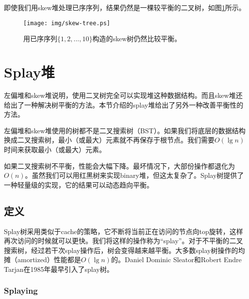 \documentclass[UTF8]{article}
\begin{document}
即使我们用skew堆处理已序序列，结果仍然是一棵较平衡的二叉树，如图\ref{fig:skew-tree}所示。

\begin{figure}[htbp]
   \begin{center}
   	  \texttt{[image: img/skew-tree.ps]}
    \caption{用已序序列$\{1, 2, ..., 10\}$构造的skew树仍然比较平衡。}
    \label{fig:skew-tree}
   \end{center}
\end{figure}



\section{Splay堆}
\label{splayheap}

左偏堆和skew堆说明，使用二叉树完全可以实现堆这种数据结构。而且skew堆还给出了一种解决树平衡的方法。本节介绍的splay堆给出了另外一种改善平衡性的方法。

左偏堆和skew堆使用的树都不是二叉搜索树（BST）。如果我们将底层的数据结构换成二叉搜索树，最小（或最大）元素就不再保存于根节点。我们需要$O(\lg n)$时间来获取最小（或最大）元素。

如果二叉搜索树不平衡，性能会大幅下降。最坏情况下，大部份操作都退化为$O(n)$。虽然我们可以用红黑树来实现binary堆，但这太复杂了。Splay树提供了一种轻量级的实现，它的结果可以动态趋向平衡。


\subsection{定义}

Splay树采用类似于cache的策略，它不断将当前正在访问的节点向top旋转，这样再次访问的时候就可以更快。我们将这样的操作称为“splay”。对于不平衡的二叉搜索树，经过若干次splay操作后，树会变得越来越平衡。大多数splay树操作的均摊（amortized）性能都是$O(\lg n)$的。Daniel Dominic Sleator和Robert Endre Tarjan在1985年最早引入了splay树\cite{wiki-splay-tree}\cite{self-adjusting-trees}。

\subsubsection{Splaying}
\end{document}
